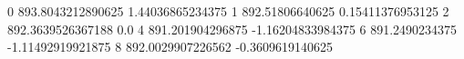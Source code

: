 0 893.8043212890625 1.44036865234375
1 892.51806640625 0.15411376953125
2 892.3639526367188 0.0
4 891.201904296875 -1.16204833984375
6 891.2490234375 -1.11492919921875
8 892.0029907226562 -0.3609619140625
